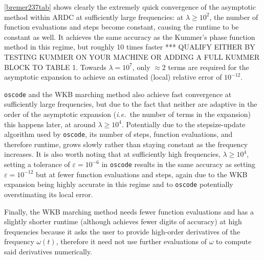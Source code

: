 \documentclass[10pt]{article}
\newcommand{\ie}{{\it i.e.\ }}
\newcommand{\om}{\omega}
\begin{document}
\begin{table}[tb]
    \renewcommand{\arraystretch}{1.2}
    \resizebox{\textwidth}{!}{}
    \caption{\label{bremer237tab} Accuracy, runtime and evaluation statistics of the algorithms
      considered (the present method,
      \texttt{oscode},
      and the WKB marching method) when applied to \cref{bremer237eq}.
      See Section~\ref{solvercomp} for an explanation of column headers
      and solver settings.}
\end{table}

\cref{bremer237tab} shows clearly the extremely quick convergence of the asymptotic method within ARDC
at sufficiently large frequencies: at $\lambda \geq 10^2$, the number of
function evaluations and steps become constant, causing the runtime to be
constant as well. It achieves the same accuracy as the Kummer's phase function method in
this regime, but roughly 10 times faster
*** QUALIFY EITHER BY TESTING KUMMER ON YOUR MACHINE OR ADDING A
FULL KUMMER BLOCK TO TABLE 1.  %
Towards $\lambda = 10^7$, only
$\approx 2$ terms are required for the asymptotic expansion to achieve an
estimated (local) relative error of $10^{-12}$. 

\texttt{oscode} and the WKB
marching method also achieve fast convergence at sufficiently large
frequencies, but due to the fact that neither are adaptive in the order of the
asymptotic expansion (\ie the number of terms in the expansion) this
happens later, at around $\lambda \geq 10^4$. Potentially due to the
stepsize-update algorithm used by \texttt{oscode}, its number of steps,
function evaluations, and therefore runtime, grows slowly rather than staying
constant as the frequency increases. It is also worth noting that at
sufficiently high frequencies, $\lambda \geq 10^4$, setting a tolerance of
$\varepsilon = 10^{-6}$ in \texttt{oscode} results in the same accuracy as
setting $\varepsilon = 10^{-12}$ but at fewer function evaluations and steps,
again due to the WKB expansion being highly accurate in this regime and to
\texttt{oscode} potentially overstimating its local error.

Finally, the WKB marching method needs fewer function evaluations and has a
slightly shorter runtime (although achieves fewer digits of accuracy) at high
frequencies because it asks the user to provide high-order derivatives of the
frequency $\om(t)$, therefore it need not use further evaluations of $\om$ to
compute said derivatives numerically.
\end{document}
